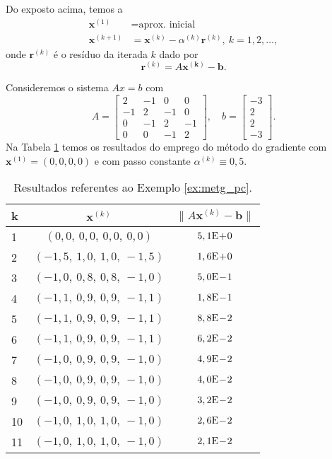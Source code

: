 Do exposto acima, temos a 
\begin{align}
  \pmb{x}^{(1)} &= \text{aprox. inicial}\\
  \pmb{x}^{(k+1)} &= \pmb{x}^{(k)} - \alpha^{(k)}\pmb{r}^{(k)},~k=1, 2, \ldots,
\end{align}
onde $\pmb{r}^{(k)}$ é o resíduo da iterada $k$ dado por
\begin{equation}
  \pmb{r}^{(k)} = A\pmb{x^{(k)}}-\pmb{b}.
\end{equation}

\begin{ex}\label{ex:metg_pc}
  Consideremos o sistema $Ax = b$ com
  \begin{equation}
    A =
    \begin{bmatrix}
      2 & -1 & 0 & 0\\
      -1 & 2 & -1 & 0\\
      0 & -1 & 2 & -1 \\
      0 & 0 & -1 & 2
    \end{bmatrix},\quad
    b =
    \begin{bmatrix}
      -3\\
      2\\
      2\\
      -3
    \end{bmatrix}.
  \end{equation}
  Na Tabela \ref{tab:metg_pc} temos os resultados do emprego do método do gradiente com $\pmb{x}^{(1)} = (0, 0, 0, 0)$ e com passo constante $\alpha^{(k)}\equiv 0,5$.

  \begin{table}[h!]
    \centering
    \begin{tabular}{l|c|c}
      k & $\pmb{x}^{(k)}$ & $\|A\pmb{x}^{(k)}-\pmb{b}\|$\\\hline
      1 & $(0,0,~0,0,~0,0,~0,0)$ & $5,1\mathrm{E}\!+\!0$\\
      2 & $(-1,5,~1,0,~1,0,~-1,5)$ & $1,6\mathrm{E}\!+\!0$\\
      3 & $(-1,0,~0,8,~0,8,~-1,0)$ & $5,0\mathrm{E}\!-\!1$\\
      4 & $(-1,1,~0,9,~0,9,~-1,1)$ & $1,8\mathrm{E}\!-\!1$\\
      5 & $(-1,1,~0,9,~0,9,~-1,1)$ & $8,8\mathrm{E}\!-\!2$\\
      6 & $(-1,1,~0,9,~0,9,~-1,1)$ & $6,2\mathrm{E}\!-\!2$\\
      7 & $(-1,0,~0,9,~0,9,~-1,0)$ & $4,9\mathrm{E}\!-\!2$\\
      8 & $(-1,0,~0,9,~0,9,~-1,0)$ & $4,0\mathrm{E}\!-\!2$\\
      9 & $(-1,0,~0,9,~0,9,~-1,0)$ & $3,2\mathrm{E}\!-\!2$\\
      10 & $(-1,0,~1,0,~1,0,~-1,0)$ & $2,6\mathrm{E}\!-\!2$\\
      11 & $(-1,0,~1,0,~1,0,~-1,0)$ & $2,1\mathrm{E}\!-\!2$\\\hline
    \end{tabular}
    \caption{Resultados referentes ao Exemplo \ref{ex:metg_pc}.}
    \label{tab:metg_pc}
  \end{table}


\end{ex}
